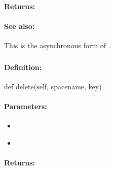 \paragraph{Returns:}


\paragraph{See also:}  This is the asynchronous form of .

\pagebreak
\subsubsection{}
\label{api:python:del}


\paragraph{Definition:}
\begin{pythoncode}
def delete(self, spacename, key)
\end{pythoncode}

\paragraph{Parameters:}
\begin{itemize}[noitemsep]
\item {}\\

\item {}\\

\end{itemize}

\paragraph{Returns:}


\pagebreak
\subsubsection{}
\label{api:python:async_del}


